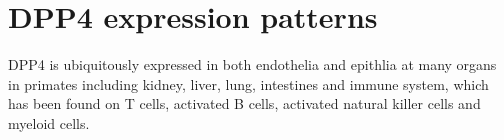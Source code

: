 \section{DPP4 expression patterns}
DPP4 is ubiquitously expressed in both endothelia and epithlia at many organs in primates including kidney, liver, lung, intestines and immune system, which has been found on T cells, activated B cells, activated natural killer cells and myeloid cells. 